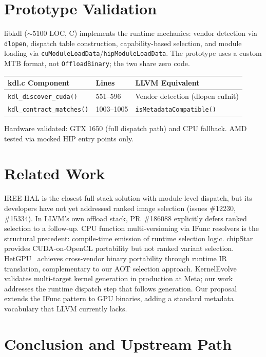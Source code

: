 \documentclass[10pt]{article}
\begin{document}
\section{Prototype Validation}

libkdl (${\sim}5100$ LOC, C) implements the runtime mechanics: vendor detection via \texttt{dlopen}, dispatch table construction, capability-based selection, and module loading via \texttt{cuModuleLoadData}/\texttt{hipModuleLoadData}.
The prototype uses a custom MTB format, not \texttt{OffloadBinary}; the two share zero code.

\begin{center}
\footnotesize
\begin{tabular}{llp{3.5cm}}
  \toprule
  kdl.c Component & Lines & LLVM Equivalent \\
  \midrule
  \texttt{kdl\_discover\_cuda()} & 551--596 & Vendor detection (dlopen cuInit) \\
  \texttt{kdl\_contract\_matches()} & 1003--1005 & \texttt{isMetadataCompatible()} \\
  \bottomrule
\end{tabular}
\normalsize
\end{center}

Hardware validated: GTX 1650 (full dispatch path) and CPU fallback. AMD tested via mocked HIP entry points only.

\section{Related Work}

IREE HAL is the closest full-stack solution with module-level dispatch, but its developers have not yet addressed ranked image selection (issues \#12230, \#15334). In LLVM's own offload stack, PR~\#186088 explicitly defers ranked selection to a follow-up.
CPU function multi-versioning via IFunc resolvers is the structural precedent: compile-time emission of runtime selection logic.
chipStar provides CUDA-on-OpenCL portability but not ranked variant selection.
HetGPU~\cite{hetgpu} achieves cross-vendor binary portability through runtime IR translation, complementary to our AOT selection approach.
KernelEvolve~\cite{kernelevolve} validates multi-target kernel generation in production at Meta; our work addresses the runtime dispatch step that follows generation.
Our proposal extends the IFunc pattern to GPU binaries, adding a standard metadata vocabulary that LLVM currently lacks.

\section{Conclusion and Upstream Path}
\end{document}
